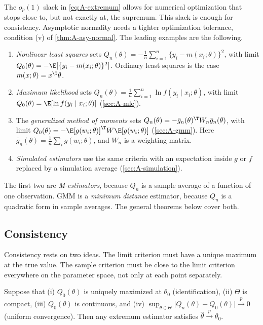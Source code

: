 The $o_p(1)$ slack in \eqref{eq:A-extremum} allows for numerical optimization that stops close to, but not exactly at, the
supremum. This slack is enough for consistency. Asymptotic normality needs a tighter optimization tolerance, condition (v)
of \cref{thm:A-asy-normal}. The leading examples are the following.
\begin{enumerate}
  \item \emph{Nonlinear least squares} sets $Q_n(\theta) = -\frac{1}{n}\sum_{i=1}^n\{y_i - m(x_i;\theta)\}^2$, with limit
  $Q_0(\theta) = -\E[\{y_i - m(x_i;\theta)\}^2]$. Ordinary least squares is the case $m(x;\theta) = x^\T\theta$.
  \item \emph{Maximum likelihood} sets $Q_n(\theta) = \frac{1}{n}\sum_{i=1}^n\ln f(y_i \mid x_i;\theta)$, with limit
  $Q_0(\theta) = \E[\ln f(y_i \mid x_i;\theta)]$ (\cref{sec:A-mle}).
  \item The \emph{generalized method of moments} sets
  $Q_n(\theta) = -\bar g_n(\theta)^\T W_n\bar g_n(\theta)$, with limit
  $Q_0(\theta) = -\E[g(w_i;\theta)]^\T W\E[g(w_i;\theta)]$ (\cref{sec:A-gmm}). Here
  $\bar g_n(\theta) = \frac{1}{n}\sum_i g(w_i;\theta)$, and $W_n$ is a weighting matrix.
  \item \emph{Simulated estimators} use the same criteria with an expectation inside $g$ or $f$ replaced by a
  simulation average (\cref{sec:A-simulation}).
\end{enumerate}
The first two are \emph{M-estimators}, because $Q_n$ is a sample average of a function of one observation. GMM is a
\emph{minimum distance} estimator, because $Q_n$ is a quadratic form in sample averages. The general theorems below cover
both.

\subsection{Consistency}\label{sec:A-ext-consistency}

Consistency rests on two ideas. The limit criterion must have a unique maximum at the true value. The sample criterion
must be close to the limit criterion everywhere on the parameter space, not only at each point separately.

\begin{theorem}\label{thm:A-consistency}
Suppose that (i) $Q_0(\theta)$ is uniquely maximized at $\theta_0$ (identification), (ii) $\Theta$ is compact, (iii)
$Q_0(\theta)$ is continuous, and (iv) $\sup_{\theta \in \Theta}\lvert Q_n(\theta) - Q_0(\theta)\rvert \xrightarrow{p} 0$
(uniform convergence). Then any extremum estimator satisfies $\hat\theta \xrightarrow{p} \theta_0$.
\end{theorem}

